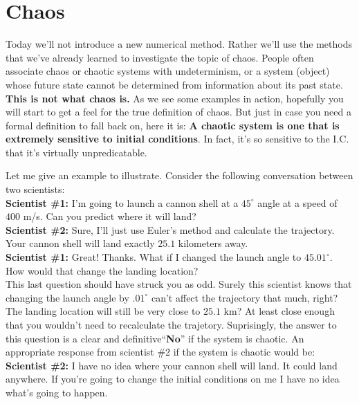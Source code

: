 \chapter{Chaos}
\label{Lab:9}

Today we'll not introduce a new numerical method.  Rather we'll use
the methods that we've already learned to investigate the topic of
chaos.  People often associate chaos or chaotic systems with
undeterminism, or a system (object) whose future state cannot be
determined from information about its past state.  \textbf{This is not
  what chaos is.}  As we see some examples in action, hopefully you
will start to get a feel for the true definition of chaos.  But just
in case you need a formal definition to fall back on, here it is:
\textbf{A chaotic system is one that is extremely sensitive to initial
  conditions}.  In fact, it's so sensitive to the I.C. that it's
virtually unpredicatable.  

Let me give an example to illustrate. Consider the following
conversation between two scientists:\\
\noindent\textbf{Scientist \#1:} I'm going to launch a cannon shell at a
$45^\circ$ angle at a speed of $400$ m/s.  Can you predict where it
will land?\\
\noindent\textbf{Scientist \#2:} Sure, I'll just use Euler's method and
calculate the trajectory.  Your cannon shell will land exactly $25.1$
kilometers away.\\
\noindent\textbf{Scientist \#1:} Great!  Thanks.  What if I changed the launch
angle to $45.01^\circ$.  How would that change the landing location?\\

This last question should have struck you as odd.  Surely this
scientist knows that changing the launch angle by $.01^\circ$ can't
affect the trajectory that much, right?  The landing location will
still be very close to $25.1$ km?  At least close enough that you
wouldn't need to recalculate the trajetory.  Suprisingly, the answer
to this question is a clear and definitive``\textbf{No}'' if the
system is chaotic.  An appropriate response from
scientist \#2 if the system is chaotic would be:\\
\noindent\textbf{Scientist \#2:} I have no idea where your cannon
shell will land.  It could land anywhere.  If you're going to change
the initial conditions
on me I have no idea what's going to happen.\\

